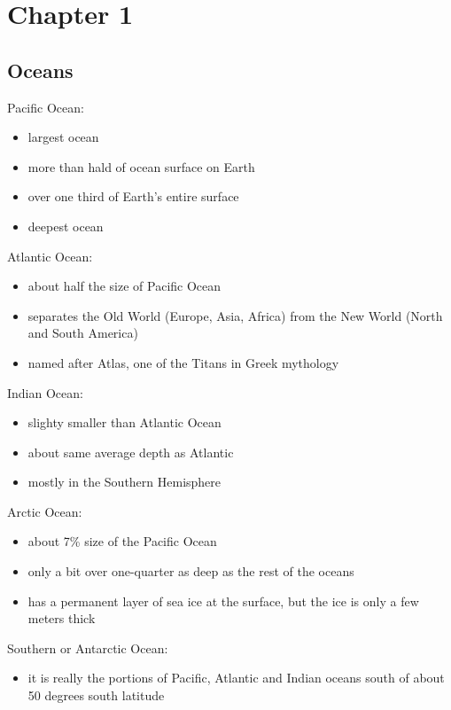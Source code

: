 \section{Chapter 1}

\subsection{Oceans}

Pacific Ocean:
\begin{itemize}
	\item largest ocean
	\item more than hald of ocean surface on Earth
	\item over one third of Earth's entire surface
	\item deepest ocean
\end{itemize}

Atlantic Ocean:
\begin{itemize}
	\item about half the size of Pacific Ocean
	\item separates the Old World (Europe, Asia, Africa) from the New World
		(North and South America)
	\item named after Atlas, one of the Titans in Greek mythology
\end{itemize}

Indian Ocean:
\begin{itemize}
	\item slighty smaller than Atlantic Ocean
	\item about same average depth as Atlantic
	\item mostly in the Southern Hemisphere
\end{itemize}

Arctic Ocean:
\begin{itemize}
	\item about 7\% size of the Pacific Ocean
	\item only a bit over one-quarter as deep as the rest of the oceans
	\item has a permanent layer of sea ice at the surface, but the ice is
		only a few meters thick
\end{itemize}

Southern or Antarctic Ocean:
\begin{itemize}
	\item it is really the portions of Pacific, Atlantic and Indian oceans
		south of about 50 degrees south latitude
\end{itemize}

